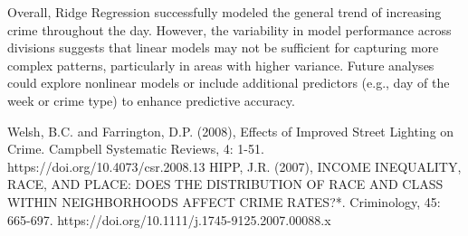 \documentclass{report}
\begin{document}
    Overall, Ridge Regression successfully modeled the general trend of increasing crime throughout the day. However, the variability in model performance across divisions suggests that linear models may not be sufficient for capturing more complex patterns, particularly in areas with higher variance. Future analyses could explore nonlinear models or include additional predictors (e.g., day of the week or crime type) to enhance predictive accuracy.
    
       
 
	
	\begin{thebibliography}{9}
			Welsh, B.C. and Farrington, D.P. (2008), Effects of Improved Street Lighting on Crime. Campbell Systematic Reviews, 4: 1-51. https://doi.org/10.4073/csr.2008.13
			HIPP, J.R. (2007), INCOME INEQUALITY, RACE, AND PLACE: DOES THE DISTRIBUTION OF RACE AND CLASS WITHIN NEIGHBORHOODS AFFECT CRIME RATES?*. Criminology, 45: 665-697. https://doi.org/10.1111/j.1745-9125.2007.00088.x
	\end{thebibliography}
	
\end{document}
